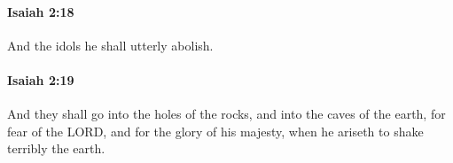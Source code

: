 		\paragraph{Isaiah 2:18} %
			\label{ISAIAH-2-18}

			And the idols he shall utterly abolish.


		\paragraph{Isaiah 2:19} %
			\label{ISAIAH-2-19}

			And they shall go into the holes of the rocks, and into the caves of the earth, for fear of the LORD, and for the glory of his majesty, when he ariseth to shake terribly the earth.


